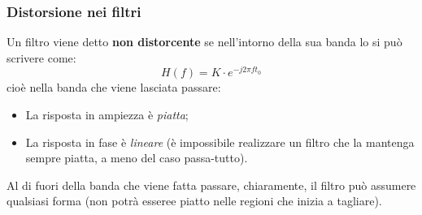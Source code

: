 \documentclass[a4paper,11pt]{article}
\begin{document}
\subsubsection{Distorsione nei filtri}
Un filtro viene detto \textbf{non distorcente} se nell'intorno della sua banda lo si può scrivere come:
$$
H(f) = K \cdot e^{-j 2 \pi f t_0}
$$
cioè nella banda che viene lasciata passare:
\begin{itemize}
	\item La risposta in ampiezza è \textit{piatta};
	\item La risposta in fase è \textit{lineare} (è impossibile realizzare un filtro che la mantenga sempre piatta, a meno del caso passa-tutto).
\end{itemize}

Al di fuori della banda che viene fatta passare, chiaramente, il filtro può assumere qualsiasi forma (non potrà esseree piatto nelle regioni che inizia a tagliare).
\end{document}
